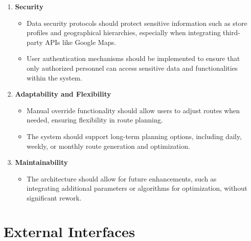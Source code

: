 \begin{enumerate}
\begin{itemize}
    \end{itemize}
    
    \item \textbf{Security}
    \begin{itemize}
        \item Data security protocols should protect sensitive information such as store profiles and geographical hierarchies, especially when integrating third-party APIs like Google Maps.
        \item User authentication mechanisms should be implemented to ensure that only authorized personnel can access sensitive data and functionalities within the system.

    \end{itemize}
    
    \item \textbf{Adaptability and Flexibility}
    \begin{itemize}
        \item Manual override functionality should allow users to adjust routes when needed, ensuring flexibility in route planning.
        \item The system should support long-term planning options, including daily, weekly, or monthly route generation and optimization.
    \end{itemize}
    
    \item \textbf{Maintainability}
    \begin{itemize}
        \item The architecture should allow for future enhancements, such as integrating additional parameters or algorithms for optimization, without significant rework.
    \end{itemize}
    
\end{enumerate}

\section{External Interfaces}



